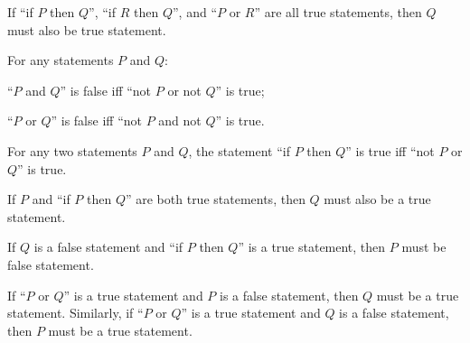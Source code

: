\begin{meta-rule}
     \label{meta-rule:disjunction-elimination}
    If ``if \( P \) then \( Q \)'', ``if \( R \) then \( Q \)'', and ``\( P \) or \( R \)'' are all true statements, then \( Q \) must also be true statement.
\end{meta-rule}

\begin{meta-rule}
     \label{meta-rule:de-morgans-laws}
    For any statements \( P \) and \( Q \):
    \begin{enumerate*}[label=(\roman*)]
        \item ``\( P \) and \( Q \)'' is false iff ``not \( P \) or not \( Q \)'' is true;
        \item ``\( P \) or \( Q \)'' is false iff ``not \( P \) and not \( Q \)'' is true.
    \end{enumerate*}
\end{meta-rule}

\begin{meta-rule}
     \label{meta-rule:material-implication}
    For any two statements \( P \) and \( Q \), the statement ``if \( P \) then \( Q \)'' is true iff ``not \( P \) or \( Q \)'' is true.
\end{meta-rule}

\begin{meta-rule}
     \label{meta-rule:modus-ponens}
    If \( P \) and ``if \( P \) then \( Q \)'' are both true statements, then \( Q \) must also be a true statement.
\end{meta-rule}

\begin{meta-rule}
     \label{meta-rule:modus-tollens}
    If \( Q \) is a false statement and ``if \( P \) then \( Q \)'' is a true statement, then \( P \) must be false statement.
\end{meta-rule}

\begin{meta-rule}
     \label{meta-rule:disjunctive-syllogism}
    If ``\( P \) or \( Q \)'' is a true statement and \( P \) is a false statement, then \( Q \) must be a true statement.
    Similarly, if ``\( P \) or \( Q \)'' is a true statement and \( Q \) is a false statement, then \( P \) must be a true statement.
\end{meta-rule}

